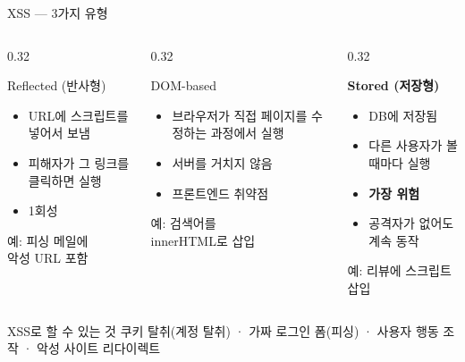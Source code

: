 \documentclass[aspectratio=169,10pt]{beamer}
\newcommand{\hlt}[1]{\textcolor{accent}{\textbf{#1}}}
\newcommand{\red}[1]{\textcolor{redTeam}{\textbf{#1}}}
\begin{document}
\begin{frame}{XSS — 3가지 유형}

\begin{columns}[T]
\begin{column}{0.32\textwidth}
\begin{block}{Reflected (반사형)}
\begin{itemize}
    \item URL에 스크립트를 넣어서 보냄
    \item 피해자가 그 링크를 클릭하면 실행
    \item 1회성
\end{itemize}
\vspace{0.3em}
{\footnotesize 예: 피싱 메일에\\악성 URL 포함}
\end{block}
\end{column}
\begin{column}{0.32\textwidth}
\begin{block}{DOM-based}
\begin{itemize}
    \item 브라우저가 직접 페이지를 수정하는 과정에서 실행
    \item 서버를 거치지 않음
    \item 프론트엔드 취약점
\end{itemize}
\vspace{0.3em}
{\footnotesize 예: 검색어를\\innerHTML로 삽입}
\end{block}
\end{column}
\begin{column}{0.32\textwidth}
\begin{block}{\red{Stored (저장형)}}
\begin{itemize}
    \item DB에 저장됨
    \item 다른 사용자가 볼 때마다 실행
    \item \hlt{가장 위험}
    \item 공격자가 없어도 계속 동작
\end{itemize}
\vspace{0.3em}
{\footnotesize 예: 리뷰에 스크립트 삽입}
\end{block}
\end{column}
\end{columns}

\vspace{0.5em}
\begin{alertblock}{XSS로 할 수 있는 것}
쿠키 탈취(계정 탈취) · 가짜 로그인 폼(피싱) · 사용자 행동 조작 · 악성 사이트 리다이렉트
\end{alertblock}
\end{frame}
\end{document}
